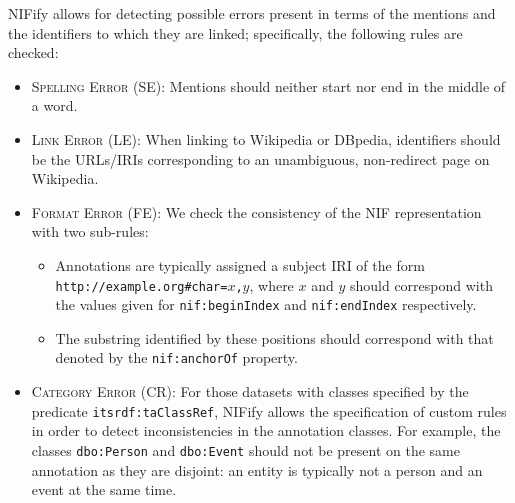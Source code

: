 \documentclass[sigconf]{acmart}
\begin{document}
NIFify allows for detecting possible errors present in terms of the mentions and the identifiers to which they are linked; specifically, the following rules are checked:


\begin{itemize} 
\item \textsc{Spelling Error} (SE): Mentions should neither start nor end in the middle of a word.
\item \textsc{Link Error} (LE): When linking to Wikipedia or DBpedia, identifiers should be the URLs/IRIs corresponding to an unambiguous, non-redirect page on Wikipedia.
\item \textsc{Format Error} (FE): We check the consistency of the NIF representation with two sub-rules:
\begin{itemize}
\item Annotations are typically assigned a subject IRI of the form \texttt{http://example.org\#char=$x$,$y$}, where $x$ and $y$ should correspond with the values given for \texttt{nif:beginIndex} and \texttt{nif:endIndex} respectively.
\item The substring identified by these positions should correspond with that denoted by the \texttt{nif:anchorOf} property.
\end{itemize}
\item \textsc{Category Error} (CR): For those datasets with classes specified by the predicate \texttt{itsrdf:taClassRef}, NIFify allows the specification of custom rules in order to detect inconsistencies in the annotation classes. For example, the classes \texttt{dbo:Person} and \texttt{dbo:Event} should not be present on the same annotation as they are disjoint: an entity is typically not a person and an event at the same time.
\end{itemize}

%
%
%
%
%
%
\end{document}
